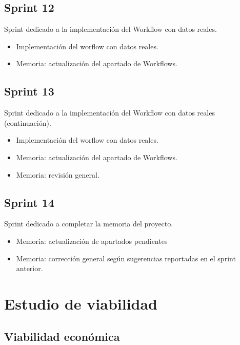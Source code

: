 \subsection{Sprint 12}

Sprint dedicado a la implementación del Workflow con datos reales. 

\begin{itemize}
	\item Implementación del worflow con datos reales. 
	\item Memoria: actualización del apartado de Workflows. 
\end{itemize}



\subsection{Sprint 13}

Sprint dedicado a la implementación del Workflow con datos reales (continuación). 

\begin{itemize}
	\item Implementación del worflow con datos reales. 
	\item Memoria: actualización del apartado de Workflows. 
	\item Memoria: revisión general. 
\end{itemize}


\subsection{Sprint 14}

Sprint dedicado a completar la memoria del proyecto. 

\begin{itemize}
	\item Memoria: actualización de apartados pendientes
	\item Memoria: corrección general según sugerencias reportadas en el sprint anterior. 
\end{itemize}

\newpage
\section{Estudio de viabilidad}

\subsection{Viabilidad económica}
